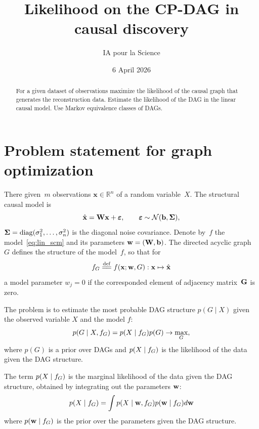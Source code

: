 \documentclass[12pt]{article}
\title{Likelihood on the CP-DAG in causal discovery}
\author{IA pour la Science}
\date{6 April 2026}
\begin{document}
\maketitle
\begin{abstract}
For a given dataset of observations maximize the likelihood of the causal graph that generates the reconstruction data.
Estimate the likelihood of the DAG in the linear causal model.
Use Markov equivalence classes of DAGs.
\end{abstract}

\section{Problem statement for graph optimization}
There given~$m$ observations $\mathbf{x}\in\mathbb{R}^n$ %
of a random variable~$X$.
The structural causal model is
\begin{equation}
    \hat{\mathbf{x}} = \mathbf{W}\mathbf{x} + \boldsymbol{\varepsilon}, \qquad \boldsymbol{\varepsilon} \sim \mathcal{N}(\mathbf{b}, {\boldsymbol{\Sigma}}),
    \label{eq:lin_scm}
\end{equation}
${\boldsymbol{\Sigma}} = \mathrm{diag}(\sigma_1^2, \dots, \sigma_n^2)$ is the diagonal noise covariance.
Denote by~$f$ the model~\eqref{eq:lin_scm} and its parameters $\mathbf{w} = (\mathbf{W}, \mathbf{b})$. %
The directed acyclic graph~$G$ defines the structure of the model~$f$, so that for
\[
    \fG \defeq f(\mathbf{x}; \bw, G): \bx \mapsto \hat{\bx}
\]
a model parameter $w_{j} = 0$ if the corresponded element of adjacency matrix~$\mathbf{G}$ is zero.

The problem is to estimate the most probable DAG structure $p(G\mid X)$ given
the observed variable $X$ and the model $f$:
\begin{equation}
    p(G \mid X, {f_{G}}) = p(X \mid {f_{G}}) p(G) \to \max_{G},
    \label{eq:bayes_score}
\end{equation}
where $p(G)$ is a prior over DAGs and $p(X \mid {f_{G}})$ is the likelihood of the data given the DAG structure.

The term $p(X \mid {f_{G}})$ is the marginal likelihood of the data given the DAG structure, obtained by integrating out the parameters $\mathbf{w}$:
\begin{equation}
    p(X \mid {f_{G}}) = \int p(X \mid \mathbf{w}, {f_{G}}) p(\mathbf{w} \mid {f_{G}}) d\mathbf{w}
    \label{eq:marginal_likelihood}
\end{equation}
where $p(\mathbf{w} \mid {f_{G}})$ is the prior over the parameters given the DAG structure.
\end{document}
